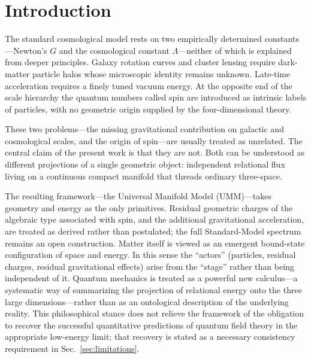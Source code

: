 \documentclass[11pt,a4paper]{article}
\begin{document}
\section{Introduction}

The standard cosmological model rests on two empirically determined constants---Newton's \(G\) and the cosmological constant \(\Lambda\)---neither of which is explained from deeper principles. Galaxy rotation curves and cluster lensing require dark-matter particle halos whose microscopic identity remains unknown. Late-time acceleration requires a finely tuned vacuum energy. At the opposite end of the scale hierarchy the quantum numbers called spin are introduced as intrinsic labels of particles, with no geometric origin supplied by the four-dimensional theory.

These two problems---the missing gravitational contribution on galactic and cosmological scales, and the origin of spin---are usually treated as unrelated. The central claim of the present work is that they are not. Both can be understood as different projections of a single geometric object: independent relational flux living on a continuous compact manifold that threads ordinary three-space.

The resulting framework---the Universal Manifold Model (UMM)---takes geometry and energy as the only primitives. Residual geometric charges of the algebraic type associated with spin, and the additional gravitational acceleration, are treated as derived rather than postulated; the full Standard-Model spectrum remains an open construction. Matter itself is viewed as an emergent bound-state configuration of space and energy. In this sense the ``actors'' (particles, residual charges, residual gravitational effects) arise from the ``stage'' rather than being independent of it. Quantum mechanics is treated as a powerful new calculus---a systematic way of summarizing the projection of relational energy onto the three large dimensions---rather than as an ontological description of the underlying reality. This philosophical stance does not relieve the framework of the obligation to recover the successful quantitative predictions of quantum field theory in the appropriate low-energy limit; that recovery is stated as a necessary consistency requirement in Sec.~\ref{sec:limitations}.
\end{document}
